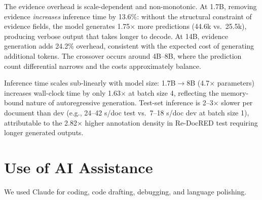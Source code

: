 \begin{table}[t]
\centering
\caption{Inference time (seconds) for SFT with vs.\ without evidence output. Overhead $=$ (with-evi $-$ no-evi) / no-evi; negative means with-evidence is faster. 1.7B--8B use batch size 4; 14B uses batch size 1.}
\label{tab:inference_efficiency}
\small
{}
\end{table}

The evidence overhead is scale-dependent and non-monotonic. At 1.7B, removing evidence \emph{increases} inference time by 13.6\%: without the structural constraint of evidence fields, the model generates 1.75$\times$ more predictions (44.6k vs.\ 25.5k), producing verbose output that takes longer to decode. At 14B, evidence generation adds 24.2\% overhead, consistent with the expected cost of generating additional tokens. The crossover occurs around 4B--8B, where the prediction count differential narrows and the costs approximately balance.

Inference time scales sub-linearly with model size: 1.7B$\to$8B (4.7$\times$ parameters) increases wall-clock time by only 1.63$\times$ at batch size 4, reflecting the memory-bound nature of autoregressive generation. Test-set inference is 2--3$\times$ slower per document than dev (e.g., 24--42 s/doc test vs.\ 7--18 s/doc dev at batch size 1), attributable to the 2.82$\times$ higher annotation density in Re-DocRED test requiring longer generated outputs.


\section{Use of AI Assistance}
We used Claude for coding, code drafting, debugging, and language polishing.
